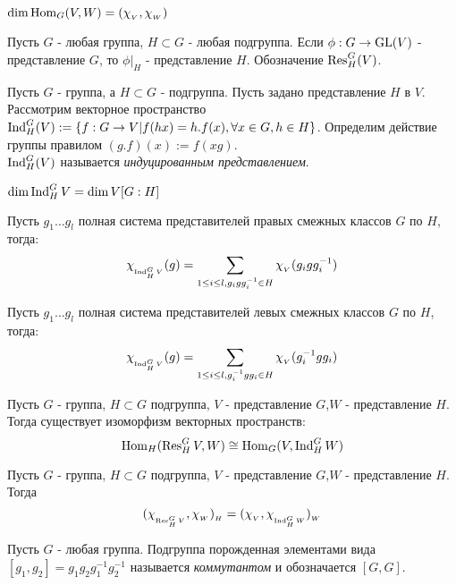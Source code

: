 \begin{ass}
$\dim\operatorname{Hom}_G(V,W)=(\chi_{_V},\chi_{_W})$
\end{ass}

\begin{ass}
Пусть $G$ - любая группа, $H\subset G$ - любая подгруппа. Если $\phi:G\to\operatorname{GL}(V)$ - представление $G$, то $\phi|_H$ - представление $H$. Обозначение $\operatorname{Res}_H^G(V)$.
\end{ass}

\begin{defi}
Пусть $G$ - группа, а $H\subset G$ - подгруппа. Пусть задано представление $H$ в $V$. Рассмотрим векторное пространство $\operatorname{Ind}_H^G(V):=\{f:G\to V|f(hx)=h.f(x),\forall x\in G,h\in H\}$. Определим действие группы правилом $(g.f)(x):=f(xg)$.\\
$\operatorname{Ind}_H^G(V)$ называется \textit{индуцированным представлением}.
\end{defi}

\begin{ass}
$\dim\operatorname{Ind}_H^GV = \dim V [G:H]$
\end{ass}

\begin{thm}
Пусть $g_1\ldots g_l$ полная система представителей правых смежных классов $G$ по $H$, тогда:
$$\chi_{_{\operatorname{Ind}_H^GV }}(g) = \sum_{1\leq i \leq l,g_igg_i^{-1}\in H}\chi_{_V}(g_igg_i^{-1})$$
\end{thm}

\begin{corol}
Пусть $g_1\ldots g_l$ полная система представителей левых смежных классов $G$ по $H$, тогда:
$$\chi_{_{\operatorname{Ind}_H^GV }}(g) = \sum_{1\leq i \leq l,g_i^{-1}gg_i\in H}\chi_{_V}(g_i^{-1}gg_i)$$
\end{corol}

\begin{thm}
Пусть $G$ - группа, $H\subset G$ подгруппа, $V$ - представление $G$,$W$ - представление $H$. Тогда существует изоморфизм векторных пространств:
$$\operatorname{Hom}_H(\operatorname{Res}_H^GV,W)\cong\operatorname{Hom}_G(V,\operatorname{Ind}_H^GW)$$
\end{thm}

\begin{corol}
Пусть $G$ - группа, $H\subset G$ подгруппа, $V$ - представление $G$,$W$ - представление $H$. Тогда
$$(\chi_{_{\operatorname{Res}_H^GV}},\chi_{_W})_{_H} = (\chi_{_V},\chi_{_{\operatorname{Ind}_H^GW}})_{_W}$$
\end{corol}

\begin{defi}
Пусть $G$ - любая группа. Подгруппа порожденная элементами вида $[g_1,g_2]=g_1g_2g_1^{-1}g_2^{-1}$ называется \textit{коммутантом} и обозначается $[G,G]$.
\end{defi}

